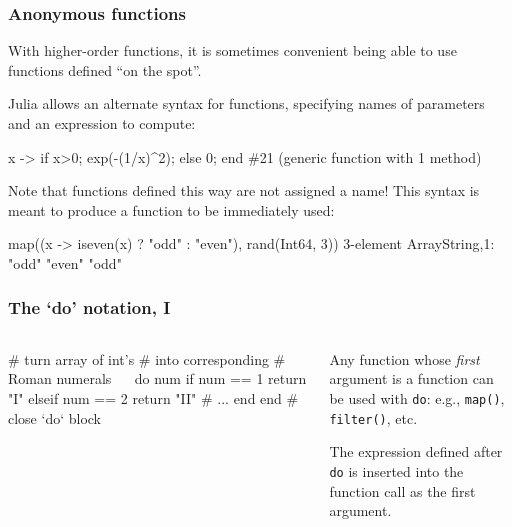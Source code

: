 \documentclass[english,serif,mathserif,xcolor=pdftex,dvipsnames,table]{beamer}
\begin{document}
\begin{frame}
  \frametitle{Anonymous functions}
  \small
  With higher-order functions, it is sometimes convenient being able
  to use functions defined ``on the spot''.

  \+ Julia allows an alternate syntax for functions, specifying names
  of parameters and an expression to compute:
\begin{semiverbatim}
\julia x -> if x>0; exp(-(1/x)^2); else 0; end
\#21 (generic function with 1 method)
\end{semiverbatim}

  \+ Note that functions defined this way are not assigned a name!
  This syntax is meant to produce a function to be immediately used:
\begin{semiverbatim}
\julia map((x -> iseven(x) ? "odd" : "even"),
           rand(Int64, 3))
3-element Array{String,1}:
 "odd"
 "even"
 "odd"
\end{semiverbatim}
\end{frame}


\begin{frame}[fragile]
  \frametitle{The `do' notation, I}
  \begin{columns}
    \begin{column}{0.5\textwidth}
\begin{jl}
# turn array of int's
# into corresponding
# Roman numerals
~~ do num
  if num == 1
    return "I"
  elseif num == 2
    return "II"
    # ...
  end
end # close `do` block
\end{jl}
    \end{column}
    \begin{column}{0.5\textwidth}
      \raggedright

      Any function whose \emph{first} argument is a function can be
      used with \texttt{do}: e.g., \texttt{map()}, \texttt{filter()},
      etc.

      \+ The expression defined after \texttt{do} is inserted into the
      function call as the first argument.
    \end{column}
  \end{columns}
\end{frame}
\end{document}

